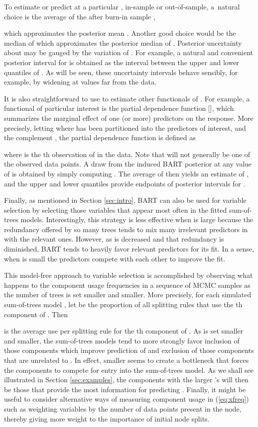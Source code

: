 \documentclass[aoas,nameyear,dvips]{arximspdf}
\begin{document}
To estimate  or predict  at a particular , in-sample or
out-of-sample, a~natural choice is the average of the after burn-in
sample  ,

which approximates the posterior mean .    Another good
choice would be the median of  which
approximates the posterior median of .  Posterior uncertainty
about  may be gauged by the variation of
. For example, a natural and convenient
 posterior interval for  is obtained as the
interval between the upper and lower  quantiles of
. As will be seen, these uncertainty intervals
behave sensibly, for example, by widening at  values far from the
data.

It is also straightforward to use  to  estimate
other functionals of .  For example, a functional of particular interest is the
partial dependence function [\citet{Fri2001}], which summarizes the
marginal effect of one (or more) predictors on the response.  More precisely,
letting  where  has been partitioned into the predictors of interest, 
and the complement , the partial dependence function is defined as

where  is the th observation of  in the data. Note
that  will not generally be one of the observed data
points.  A draw from the induced BART posterior  at any value of  is obtained by
simply computing .  The average of  then yields an
estimate of , and the upper and lower  quantiles  provide endpoints
of  posterior intervals for .


Finally, as mentioned in Section \ref{sec:intro}, BART can also be used
for variable selection by selecting those variables that appear most
often in the fitted sum-of-trees models.  Interestingly, this strategy
is less effective when  is large because the redundancy offered by
so many trees tends to mix many irrelevant predictors in with the
relevant ones.  However, as  is decreased and that redundancy is
diminished, BART tends to heavily favor relevant predictors for its
fit.  In a sense, when  is small the predictors compete with each
other to improve the fit.

This model-free approach to variable selection is accomplished by
observing what happens to the  component usage frequencies in a
sequence of MCMC samples  as the number of trees 
is set smaller and smaller.  More precisely, for each simulated
sum-of-trees model , let  be the proportion of all
splitting rules that use the th component of .  Then

is the average use per splitting rule for the th component of .
As  is set smaller and smaller, the sum-of-trees models tend to more
strongly favor inclusion of those  components which improve
prediction of  and exclusion of those  components that are
unrelated to .  In effect,  smaller  seems to create a bottleneck
that forces the  components to compete for entry into the
sum-of-trees model.  As we shall see illustrated in Section
\ref{sec:examples}, the  components with the larger 's will
then be those that provide the most information for predicting .
Finally, it might be useful to consider alternative ways of measuring
component usage in (\ref{eq:xfreq}) such as weighting variables by the
number of data points present in the node, thereby giving more weight
to the importance of initial node splits.
\end{document}
